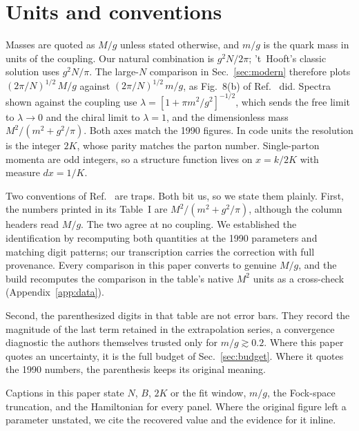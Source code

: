\section{Units and conventions}
\label{app:units}

Masses are quoted as $M/g$ unless stated otherwise, and $m/g$ is the quark
mass in units of the coupling.  Our natural combination is $g^2 N/2\pi$;
't~Hooft's classic solution uses $g^2 N/\pi$.  The large-$N$ comparison in
Sec.~\ref{sec:modern} therefore plots $(2\pi/N)^{1/2}\,M/g$ against
$(2\pi/N)^{1/2}\,m/g$, as Fig.~8(b) of Ref.~\cite{Hornbostel:1988fb} did.
Spectra shown against the coupling use
$\lambda = [1 + \pi m^2/g^2]^{-1/2}$, which sends the free limit to
$\lambda \to 0$ and the chiral limit to $\lambda = 1$, and the
dimensionless mass $M^2/(m^2 + g^2/\pi)$.  Both axes match the 1990
figures.  In code units the resolution is the integer $2K$, whose parity
matches the parton number.  Single-parton momenta are odd integers, so a
structure function lives on $x = k/2K$ with measure $dx = 1/K$.

Two conventions of Ref.~\cite{Hornbostel:1988fb} are traps.  Both bit us,
so we state them plainly.  First, the numbers printed in its Table~I are
$M^2/(m^2+g^2/\pi)$, although the column headers read $M/g$.  The two agree
at no coupling.  We established the identification by recomputing both
quantities at the 1990 parameters and matching digit patterns; our
transcription carries the correction with full provenance.  Every
comparison in this paper converts to genuine $M/g$, and the build
recomputes the comparison in the table's native $M^2$ units as a
cross-check (Appendix~\ref{app:data}).

Second, the parenthesized digits in that table are not error bars.  They
record the magnitude of the last term retained in the extrapolation series,
a convergence diagnostic the authors themselves trusted only for
$m/g \gtrsim 0.2$.  Where this paper quotes an uncertainty, it is the full
budget of Sec.~\ref{sec:budget}.  Where it quotes the 1990 numbers, the
parenthesis keeps its original meaning.

Captions in this paper state $N$, $B$, $2K$ or the fit window, $m/g$, the
Fock-space truncation, and the Hamiltonian for every panel.  Where the
original figure left a parameter unstated, we cite the recovered value and
the evidence for it inline.
